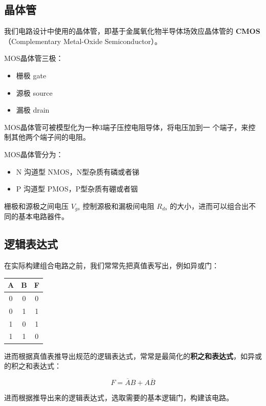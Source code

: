 \documentclass[UTF8]{ctexart}
\begin{document}
\subsection{晶体管}

我们电路设计中使用的晶体管，即基于金属氧化物半导体场效应晶体管的 \textbf{CMOS}（Complementary
Metal-Oxide Semiconductor）。

MOS晶体管三极：

\begin{itemize}
    \item 栅极 gate
    \item 源极 source
    \item 漏极 drain
\end{itemize}

MOS晶体管可被模型化为一种3端子压控电阻导体，将电压加到一
个端子，来控制其他两个端子间的电阻。

MOS晶体管分为：
\begin{itemize}
    \item N 沟道型 NMOS，N型杂质有磷或者锑
    \item P 沟道型 PMOS，P型杂质有硼或者铟
\end{itemize}

栅极和源极之间电压 $V_{gs}$ 控制源极和漏极间电阻 $R_{ds}$ 的大小，进而可以组合出不同的基本电路器件。

\subsection{逻辑表达式}

在实际构建组合电路之前，我们常常先把真值表写出，例如异或门：

\begin{center}
    \centering
    \begin{tabular}{cc|c}
        \hline
        A & B & F \\
        \hline
        0 & 0 & 0 \\
        0 & 1 & 1 \\
        1 & 0 & 1 \\
        1 & 1 & 0 \\
        \hline
    \end{tabular}
\end{center}

进而根据真值表推导出规范的逻辑表达式，常常是最简化的\textbf{积之和表达式}，如异或的积之和表达式：

\[
    F = \overline{A}B + A\overline{B}
\]

进而根据推导出来的逻辑表达式，选取需要的基本逻辑门，构建该电路。
\end{document}
